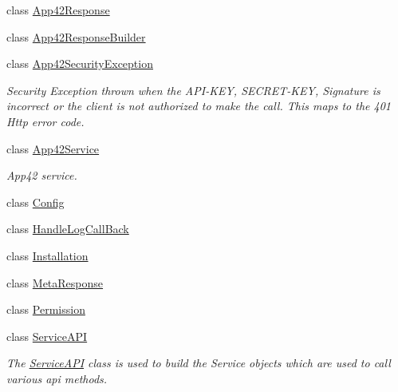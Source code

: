 \begin{DoxyCompactItemize}
class \hyperlink{classcom_1_1shephertz_1_1app42_1_1paas_1_1sdk_1_1csharp_1_1_app42_response}{App42\+Response}
\item 
class \hyperlink{classcom_1_1shephertz_1_1app42_1_1paas_1_1sdk_1_1csharp_1_1_app42_response_builder}{App42\+Response\+Builder}
\item 
class \hyperlink{classcom_1_1shephertz_1_1app42_1_1paas_1_1sdk_1_1csharp_1_1_app42_security_exception}{App42\+Security\+Exception}
\begin{DoxyCompactList}\small\item\em Security Exception thrown when the A\+P\+I-\/\+K\+E\+Y, S\+E\+C\+R\+E\+T-\/\+K\+E\+Y, Signature is incorrect or the client is not authorized to make the call. This maps to the 401 Http error code. \end{DoxyCompactList}\item 
class \hyperlink{classcom_1_1shephertz_1_1app42_1_1paas_1_1sdk_1_1csharp_1_1_app42_service}{App42\+Service}
\begin{DoxyCompactList}\small\item\em App42 service. \end{DoxyCompactList}\item 
class \hyperlink{classcom_1_1shephertz_1_1app42_1_1paas_1_1sdk_1_1csharp_1_1_config}{Config}
\item 
class \hyperlink{classcom_1_1shephertz_1_1app42_1_1paas_1_1sdk_1_1csharp_1_1_handle_log_call_back}{Handle\+Log\+Call\+Back}
\item 
class \hyperlink{classcom_1_1shephertz_1_1app42_1_1paas_1_1sdk_1_1csharp_1_1_installation}{Installation}
\item 
class \hyperlink{classcom_1_1shephertz_1_1app42_1_1paas_1_1sdk_1_1csharp_1_1_meta_response}{Meta\+Response}
\item 
class \hyperlink{classcom_1_1shephertz_1_1app42_1_1paas_1_1sdk_1_1csharp_1_1_permission}{Permission}
\item 
class \hyperlink{classcom_1_1shephertz_1_1app42_1_1paas_1_1sdk_1_1csharp_1_1_service_a_p_i}{Service\+A\+P\+I}
\begin{DoxyCompactList}\small\item\em The \hyperlink{classcom_1_1shephertz_1_1app42_1_1paas_1_1sdk_1_1csharp_1_1_service_a_p_i}{Service\+A\+P\+I} class is used to build the Service objects which are used to call various api methods. \end{DoxyCompactList}\end{DoxyCompactItemize}
